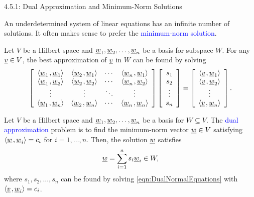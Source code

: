 \documentclass[10pt,letterpaper,english]{beamer}
\begin{document}
\begin{frame}{4.5.1: Dual Approximation and Minimum-Norm Solutions}

An underdetermined system of linear equations has an infinite number of solutions.
It often makes sense to prefer the \textcolor{blue}{minimum-norm solution}.

\vspace{3mm}

Let $V$ be a Hilbert space and $\underline{w}_1 ,\underline{w}_2 , \ldots, \underline{w}_n$ be a basis for subspace $W$.
For any $\underline{v} \in V$, the best approximation of $\underline{v}$ in $W$ can be found by solving
\begin{equation} \label{eqn:DualNormalEquations}
\left[ \begin{array}{cccc}
{\left\langle  \underline{w}_1  \mskip2mu ,  \underline{w}_1  \right\rangle}
& {\left\langle  \underline{w}_2  \mskip2mu ,  \underline{w}_1  \right\rangle} & \cdots
& {\left\langle  \underline{w}_n  \mskip2mu ,  \underline{w}_1  \right\rangle} \\
{\left\langle  \underline{w}_1  \mskip2mu ,  \underline{w}_2  \right\rangle}
& {\left\langle  \underline{w}_2  \mskip2mu ,  \underline{w}_2  \right\rangle} & \cdots
& {\left\langle  \underline{w}_n  \mskip2mu ,  \underline{w}_2  \right\rangle} \\
\vdots & \vdots & \ddots & \vdots \\
{\left\langle  \underline{w}_1  \mskip2mu ,  \underline{w}_n  \right\rangle}
& {\left\langle  \underline{w}_2  \mskip2mu ,  \underline{w}_n  \right\rangle} & \cdots
& {\left\langle  \underline{w}_n  \mskip2mu ,  \underline{w}_n  \right\rangle}
\end{array} \right]
\left[ \begin{array}{c}
s_1 \\ s_2 \\ \vdots \\ s_n \end{array} \right]
= \left[ \begin{array}{c}
{\left\langle  \underline{v}  \mskip2mu ,  \underline{w}_1  \right\rangle} \\
{\left\langle  \underline{v}  \mskip2mu ,  \underline{w}_2  \right\rangle} \\ \vdots \\
{\left\langle  \underline{v}  \mskip2mu ,  \underline{w}_n  \right\rangle} \end{array} \right] .
\end{equation}

\begin{theorem}
Let $V$ be a Hilbert space and $\underline{w}_1 ,\underline{w}_2 , \ldots, \underline{w}_n$ be a basis for $W\subseteq V$.
The \textcolor{blue}{dual approximation} problem is to find the minimum-norm vector $\underline{w}\in V$ satisfying ${\left\langle  \underline{w}  \mskip2mu ,  \underline{w}_i  \right\rangle} = c_i$ for $i=1,\ldots,n$.
Then, the solution $\underline{w}$ satisfies \vspace{-1.5mm}
\[ \vecnot{w} = \sum_{i=1}^n s_i \vecnot{w}_i \in W, \vspace{-1.5mm} \]
where $s_1,s_2,\ldots,s_n$ can be found by solving \eqref{eqn:DualNormalEquations} with ${\left\langle  \underline{v}  \mskip2mu ,  \underline{w}_i  \right\rangle} = c_i$.
\end{theorem}

\end{frame}
\end{document}
